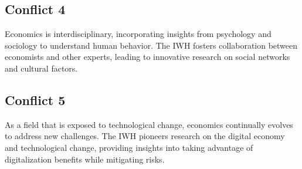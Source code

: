 \documentclass{article}
\begin{document}
\subsection{Conflict 4}
Economics is interdisciplinary, incorporating insights from psychology and sociology to understand human behavior. The IWH fosters collaboration between economists and other experts, leading to innovative research on social networks and cultural factors.

\subsection{Conflict 5}
As a field that is exposed to technological change, economics continually evolves to address new challenges. The IWH pioneers research on the digital economy and technological change, providing insights into taking advantage of digitalization benefits while mitigating risks.

\end{document}
